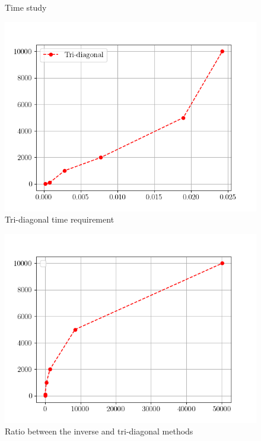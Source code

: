 \begin{mdframed}[style=MyFrame]
\begin{figure}[H]
        \caption{Time study}
        \label{fig:time-comparison}
    \end{figure}
    \begin{figure}[H]
        \includegraphics[height=0.35\textheight]{../media/tri-solve.png}
        \caption{Tri-diagonal time requirement}
        \label{fig:time-tri}
    \end{figure}

    \begin{figure}[H]
        \includegraphics[height=0.35\textheight]{../media/time-ratio-solve.png}
        \caption{Ratio between the inverse and tri-diagonal methods}
        \label{fig:time-ratio}
    \end{figure}
\end{mdframed}
